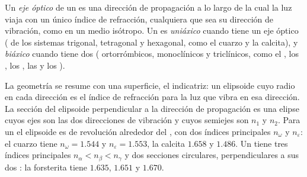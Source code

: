 \begin{definition}\label{def:b1:optical-mineralogy:optic-axis}
Un \emph{eje óptico} de un  es una dirección de propagación a lo largo de la
cual la luz viaja con un único índice de refracción, cualquiera que sea su dirección de vibración, como en un medio
isótropo. Un  es \emph{uniáxico} cuando tiene un eje óptico ( de los sistemas
trigonal, tetragonal y hexagonal, como el cuarzo y la calcita), y \emph{biáxico} cuando tiene dos
( ortorrómbicos, monoclínicos y triclínicos, como el , los , los , las  y los
).
\end{definition}

La geometría se resume con una superficie, el indicatriz: un elipsoide cuyo radio en cada dirección es el índice de
refracción para la luz que vibra en esa dirección. La sección del elipsoide perpendicular a la dirección de propagación
es una elipse cuyos ejes son las dos direcciones de vibración y cuyos semiejes son $n_1$ y $n_2$. Para un 
 el elipsoide es de revolución alrededor del , con dos índices principales $n_\omega$ y
$n_\varepsilon$: el cuarzo tiene $n_\omega = 1.544$ y $n_\varepsilon = 1.553$, la calcita $1.658$ y $1.486$.
Un   tiene tres índices principales $n_\alpha < n_\beta < n_\gamma$ y dos secciones circulares,
perpendiculares a sus dos : la forsterita tiene $1.635$, $1.651$ y $1.670$.

